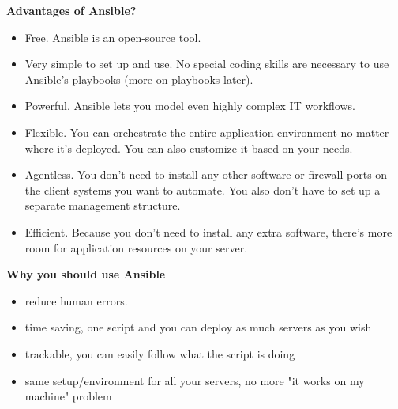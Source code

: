 \documentclass[fancy,11pt,titlestyle=display]{style/elegantbook}
\begin{document}
\textbf{Advantages of Ansible?}
\begin{itemize}
\item Free. Ansible is an open-source tool.
\item Very simple to set up and use. No special coding skills are necessary to use Ansible's playbooks (more on playbooks later).
\item Powerful. Ansible lets you model even highly complex IT workflows. 
\item Flexible. You can orchestrate the entire application environment no matter where it's deployed. You can also customize it based on your needs.
\item Agentless. You don't need to install any other software or firewall ports on the client systems you want to automate. You also don’t have to set up a separate management structure.
\item Efficient. Because you don't need to install any extra software, there's more room for application resources on your server.
\end{itemize}

\textbf{Why you should use Ansible}
\begin{itemize}
\item reduce human errors.
\item time saving, one script and you can deploy as much servers as you wish
\item trackable, you can easily follow what the script is doing
\item same setup/environment for all your servers, no more "it works on my machine" problem
\end{itemize}
\end{document}
